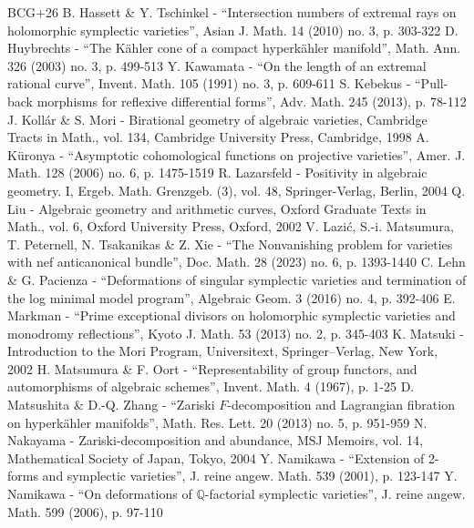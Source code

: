 \documentclass[10pt]{amsart}
\theoremstyle{plain}
\theoremstyle{definition}
\begin{document}
\begin{thebibliography}{BCG+26}
 B. Hassett \& Y. Tschinkel - “Intersection numbers of extremal rays on holomorphic symplectic varieties”, Asian J. Math. 14 (2010) no. 3, p. 303-322
 D. Huybrechts - “The Kähler cone of a compact hyperkähler manifold”, Math. Ann. 326 (2003) no. 3, p. 499-513
 Y. Kawamata - “On the length of an extremal rational curve”, Invent. Math. 105 (1991) no. 3, p. 609-611
 S. Kebekus - “Pull-back morphisms for reflexive differential forms”, Adv. Math. 245 (2013), p. 78-112
 J. Kollár \& S. Mori - Birational geometry of algebraic varieties, Cambridge Tracts in Math., vol. 134, Cambridge University Press, Cambridge, 1998
 A. Küronya - “Asymptotic cohomological functions on projective varieties”, Amer. J. Math. 128 (2006) no. 6, p. 1475-1519
 R. Lazarsfeld - Positivity in algebraic geometry. I, Ergeb. Math. Grenzgeb. (3), vol. 48, Springer-Verlag, Berlin, 2004
 Q. Liu - Algebraic geometry and arithmetic curves, Oxford Graduate Texts in Math., vol. 6, Oxford University Press, Oxford, 2002
 V. Lazić, S.-i. Matsumura, T. Peternell, N. Tsakanikas \& Z. Xie - “The Nonvanishing problem for varieties with nef anticanonical bundle”, Doc. Math. 28 (2023) no. 6, p. 1393-1440
 C. Lehn \& G. Pacienza - “Deformations of singular symplectic varieties and termination of the log minimal model program”, Algebraic Geom. 3 (2016) no. 4, p. 392-406
 E. Markman - “Prime exceptional divisors on holomorphic symplectic varieties and monodromy reflections”, Kyoto J. Math. 53 (2013) no. 2, p. 345-403
 K. Matsuki - Introduction to the Mori Program, Universitext, Springer–Verlag, New York, 2002
 H. Matsumura \& F. Oort - “Representability of group functors, and automorphisms of algebraic schemes”, Invent. Math. 4 (1967), p. 1-25
 D. Matsushita \& D.-Q. Zhang - “Zariski $F$-decomposition and Lagrangian fibration on hyperkähler manifolds”, Math. Res. Lett. 20 (2013) no. 5, p. 951-959
 N. Nakayama - Zariski-decomposition and abundance, MSJ Memoirs, vol. 14, Mathematical Society of Japan, Tokyo, 2004
 Y. Namikawa - “Extension of 2-forms and symplectic varieties”, J. reine angew. Math. 539 (2001), p. 123-147
 Y. Namikawa - “On deformations of $\mathbb{Q}$-factorial symplectic varieties”, J. reine angew. Math. 599 (2006), p. 97-110

\end{thebibliography}
\end{document}

